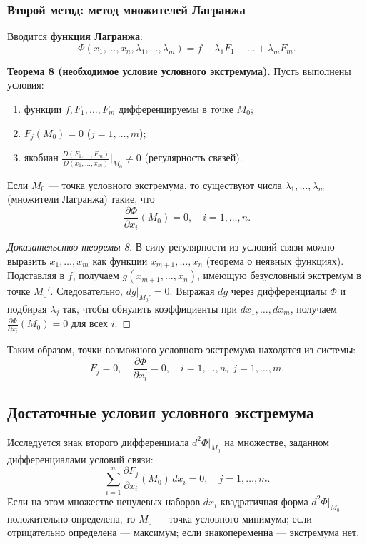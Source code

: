 \documentclass{article}
\theoremstyle{definition}
\begin{document}
\subsubsection{Второй метод: метод множителей Лагранжа}
Вводится \textbf{функция Лагранжа}:
\[
\Phi(x_1,\dots,x_n,\lambda_1,\dots,\lambda_m)=f+\lambda_1F_1+\dots+\lambda_mF_m.
\]

\textbf{Теорема 8 (необходимое условие условного экстремума).} Пусть выполнены условия:
\begin{enumerate}
    \item функции $f,F_1,\dots,F_m$ дифференцируемы в точке $M_0$;
    \item $F_j(M_0)=0$ ($j=1,\dots,m$);
    \item якобиан $\frac{D(F_1,\dots,F_m)}{D(x_1,\dots,x_m)}\big|_{M_0}\neq0$ (регулярность связей).
\end{enumerate}
Если $M_0$ — точка условного экстремума, то существуют числа $\lambda_1,\dots,\lambda_m$ (множители Лагранжа) такие, что
\[
\frac{\partial\Phi}{\partial x_i}(M_0)=0,\quad i=1,\dots,n.
\]

\begin{proof}[Доказательство теоремы 8]
В силу регулярности из условий связи можно выразить $x_1,\dots,x_m$ как функции $x_{m+1},\dots,x_n$ (теорема о неявных функциях). Подставляя в $f$, получаем $g(x_{m+1},\dots,x_n)$, имеющую безусловный экстремум в точке $M_0'$. Следовательно, $dg|_{M_0'}=0$. Выражая $dg$ через дифференциалы $\Phi$ и подбирая $\lambda_j$ так, чтобы обнулить коэффициенты при $dx_1,\dots,dx_m$, получаем $\frac{\partial\Phi}{\partial x_i}(M_0)=0$ для всех $i$.
\end{proof}

Таким образом, точки возможного условного экстремума находятся из системы:
\[
F_j=0,\quad \frac{\partial\Phi}{\partial x_i}=0,\quad i=1,\dots,n,\; j=1,\dots,m.
\]

\subsection{Достаточные условия условного экстремума}
Исследуется знак второго дифференциала $d^2\Phi|_{M_0}$ на множестве, заданном дифференциалами условий связи:
\[
\sum_{i=1}^n\frac{\partial F_j}{\partial x_i}(M_0)\,dx_i=0,\quad j=1,\dots,m.
\]
Если на этом множестве ненулевых наборов $dx_i$ квадратичная форма $d^2\Phi|_{M_0}$ положительно определена, то $M_0$ — точка условного минимума; если отрицательно определена — максимум; если знакопеременна — экстремума нет.
\end{document}
